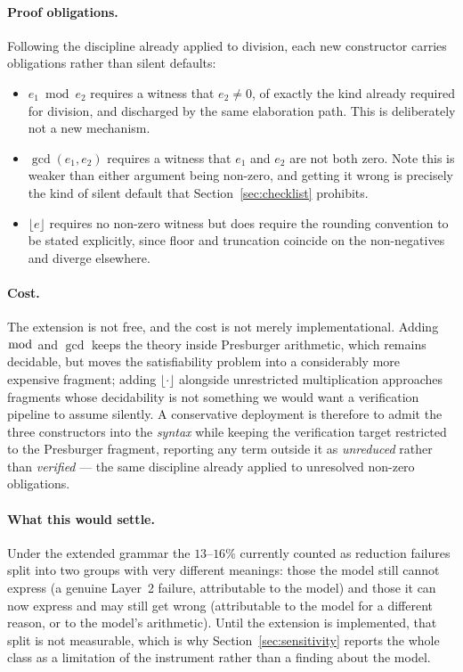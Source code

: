 \documentclass[11pt,a4paper]{article}
\begin{document}
\paragraph{Proof obligations.}
Following the discipline already applied to division, each new constructor
carries obligations rather than silent defaults:
\begin{itemize}
  \item $e_1 \bmod e_2$ requires a witness that $e_2 \neq 0$, of exactly the
        kind already required for division, and discharged by the same
        elaboration path.  This is deliberately not a new mechanism.
  \item $\gcd(e_1,e_2)$ requires a witness that $e_1$ and $e_2$ are not both
        zero.  Note this is weaker than either argument being non-zero, and
        getting it wrong is precisely the kind of silent default that
        Section~\ref{sec:checklist} prohibits.
  \item $\lfloor e \rfloor$ requires no non-zero witness but does require the
        rounding convention to be stated explicitly, since floor and truncation
        coincide on the non-negatives and diverge elsewhere.
\end{itemize}

\paragraph{Cost.}
The extension is not free, and the cost is not merely implementational.
Adding $\bmod$ and $\gcd$ keeps the theory inside Presburger arithmetic, which
remains decidable, but moves the satisfiability problem into a considerably
more expensive fragment; adding $\lfloor \cdot \rfloor$ alongside unrestricted
multiplication approaches fragments whose decidability is not something we would
want a verification pipeline to assume silently.  A conservative deployment is
therefore to admit the three constructors into the \emph{syntax} while keeping
the verification target restricted to the Presburger fragment, reporting any
term outside it as \emph{unreduced} rather than \emph{verified} --- the same
discipline already applied to unresolved non-zero obligations.

\paragraph{What this would settle.}
Under the extended grammar the $13$--$16\%$ currently counted as reduction
failures split into two groups with very different meanings: those the model
still cannot express (a genuine Layer~2 failure, attributable to the model) and
those it can now express and may still get wrong (attributable to the model for
a different reason, or to the model's arithmetic).  Until the extension is
implemented, that split is not measurable, which is why Section~\ref{sec:sensitivity}
reports the whole class as a limitation of the instrument rather than a finding
about the model.
\end{document}
